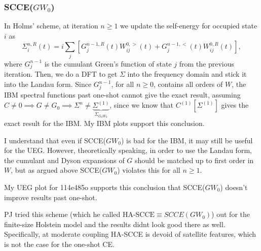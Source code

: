 \subsubsection{SCCE($GW_0$)}
In Holms' scheme, at iteration $n\geq 1$ we update the self-energy for occupied state $i$ as
\begin{equation}
    \Sigma_i^{n,R}(t)=i \sum_j\left[G_j^{n-1,R}(t) W_{i j}^{0,>}(t)+G_j^{n-1,<}(t) W_{i j}^{0, R}(t)\right],
\end{equation}
where $G_j^{n-1}$ is the cumulant Green's function of state $j$ from the previous iteration. Then, we do a DFT to get $\Sigma$ into the frequency domain and stick it into the Landau form. Since $G_j^{n-1}$, for all $n\geq 0$, contains all orders of $W$, the IBM spectral functions past one-shot cannot give the exact result, assuming $C\neq0\implies G\neq G_0\implies \Sigma^n \neq \underbrace{\Sigma^{(1)}}_{\Sigma_{G_0W_0}}$, since we know that $C^{(1)}[\Sigma^{(1)}]$ gives the exact result for the IBM. My IBM plots support this conclusion.
\begin{tcolorbox}[title=Moving to more complex models ]
I understand that even if SCCE($GW_0$) is bad for the IBM, it may still be useful for the UEG. However, theoretically speaking, in order to use the Landau form, the cumulant and Dyson expansions of $G$ should be matched up to first order in $W$, but as argued above SCCE($GW_0$) violates this for all $n\geq 1$.
\end{tcolorbox}
\begin{tcolorbox}[title=Results for the UEG ]
 My UEG plot for 114e485o supports this conclusion that SCCE($GW_0$) doesn't improve results past one-shot.
\end{tcolorbox}
\begin{tcolorbox}[title=Results for the finite-size Holstein model]
PJ tried this scheme (which he called $\text{HA-SCCE}\equiv SCCE(GW_0)$) out for the finite-size Holstein model and the results didnt look good there as well. Specifically, at moderate coupling HA-SCCE is devoid of satellite features, which is not the case for the one-shot CE.
\end{tcolorbox}
